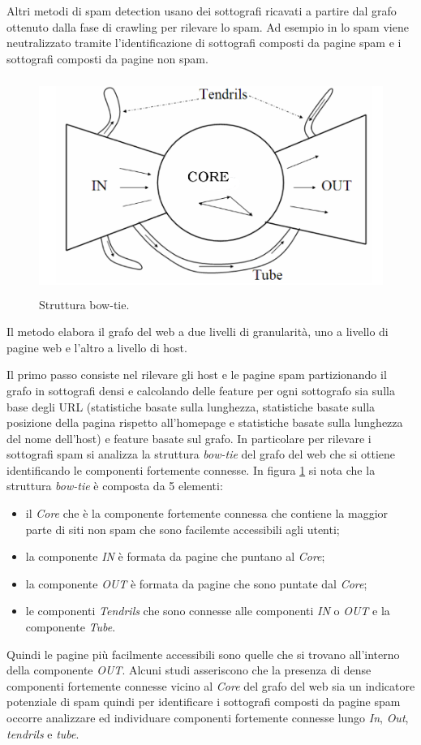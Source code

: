 Altri metodi di spam detection usano dei sottografi ricavati a partire dal grafo ottenuto dalla fase di crawling per rilevare lo spam. Ad esempio in \cite{Leon-Suematsu:2011:WSD:2052138.2052339} lo spam viene neutralizzato tramite l'identificazione di sottografi composti da pagine spam e i sottografi composti da pagine non spam.  
\begin{figure}
\centering
\includegraphics[height=7cm]{immagini/sub/sub}
\caption{Struttura bow-tie.}
\label{fig:sub}
\end{figure}
Il metodo elabora il grafo del web a due livelli di granularità, uno a livello di pagine web  e l'altro a livello di host. 

Il primo passo consiste nel rilevare gli host e le pagine spam partizionando il grafo in sottografi densi e calcolando delle feature per ogni sottografo sia sulla base degli URL (statistiche basate sulla lunghezza, statistiche basate sulla posizione della pagina rispetto all'homepage e statistiche basate sulla lunghezza del nome dell'host) e feature basate sul grafo. In particolare per rilevare i sottografi spam si analizza la struttura \textit{bow-tie} del grafo del web che si ottiene identificando le componenti fortemente connesse. In figura \ref{fig:sub} si nota che la struttura \textit{bow-tie} è composta da 5 elementi:
\begin{itemize}
 \item il \textit{Core} che è la componente fortemente connessa che contiene la maggior parte di siti non spam che sono facilemte accessibili agli utenti;
 \item la componente \textit{IN} è formata da pagine che puntano al \textit{Core};
 \item la componente \textit{OUT} è formata da pagine che sono puntate dal \textit{Core};
 \item le componenti \textit{Tendrils} che sono connesse alle componenti \textit{IN} o \textit{OUT} e la componente \textit{Tube}.
\end{itemize}
Quindi le pagine più facilmente accessibili sono quelle che si trovano all'interno della componente \textit{OUT}. Alcuni studi asseriscono che la presenza di dense componenti fortemente connesse vicino al \textit{Core} del grafo del web sia un indicatore potenziale di spam quindi per identificare i sottografi composti da pagine spam occorre analizzare ed individuare componenti fortemente connesse lungo \textit{In}, \textit{Out}, \textit{tendrils} e \textit{tube}.

